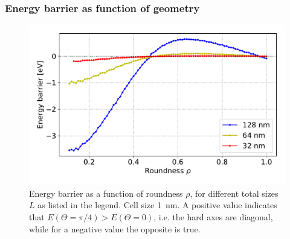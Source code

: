 \documentclass[11pt,a4paper,english]{article}
\begin{document}
\subsubsection{Energy barrier as function of geometry}
\begin{figure}
    \centering
    \includegraphics[width=0.9\columnwidth]{Figures/biaxial_island/Barrier/Plus_32,64,128_0.1-1_aPi128_B0.01_cell1nm.pdf}
    \caption{Energy barrier as a function of roundness $\rho$, for different total sizes $L$ as listed in the legend. Cell size \SI{1}{\nano\metre}. A positive value indicates that $E(\Theta=\pi/4) > E(\Theta=0)$, i.e. the hard axes are diagonal, while for a negative value the opposite is true.}
    \label{fig:barrier-cell_size}
\end{figure}
\end{document}
